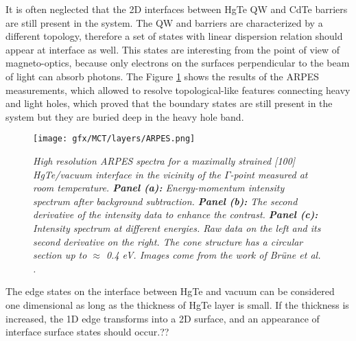 \documentclass[titlepage,a4paper]{book}
\begin{document}
It is often neglected that the 2D interfaces between HgTe QW and CdTe barriers are still present in the system. The QW and barriers are characterized by a different topology, therefore a set of states with linear dispersion relation should appear at interface as well. This states are interesting from the point of view of magneto-optics, because only electrons on the surfaces perpendicular to the beam of light can absorb photons. The Figure \ref{fig:Layers_ARPES} shows the results of the ARPES measurements, which allowed to resolve topological-like features connecting heavy and light holes, which proved that the boundary states are still present in the system but they are buried deep in the heavy hole band. 

\begin{figure}[ht]
	\centering
	\texttt{[image: gfx/MCT/layers/ARPES.png]}
	\vspace{-10pt}
	\caption{\textit{High resolution ARPES spectra for a maximally strained [100] HgTe/vacuum interface in the vicinity of the $\Gamma$-point measured at room temperature. \textbf{Panel (a):} Energy-momentum intensity spectrum after background subtraction. \textbf{Panel (b):} The second derivative of the intensity data to enhance the contrast. \textbf{Panel (c):} Intensity spectrum at different energies. Raw data on the left and its second derivative on the right. The cone structure has a circular section up to $\approx$ 0.4 eV. Images come from the work of Brüne \textit{et al.} \cite{Brune_State2}.}}
	\label{fig:Layers_ARPES}
\end{figure} 

The edge states on the interface between HgTe and vacuum can be considered one dimensional as long as the thickness of HgTe layer is small. If the thickness is increased, the 1D edge transforms into a 2D surface, and an appearance of interface surface states should occur.??
\end{document}
